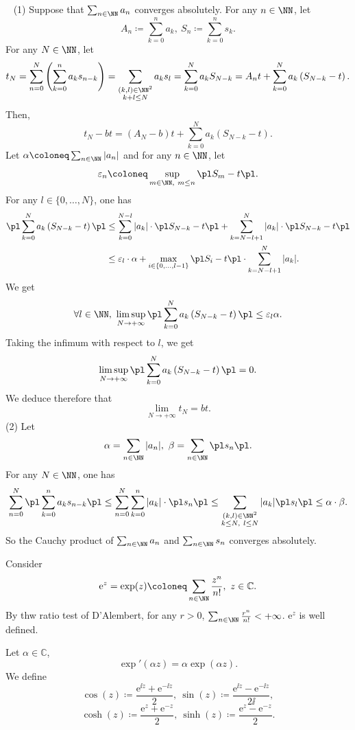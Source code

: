 \begin{proofenv}
    \ \newline
    (1) Suppose that $\sum_{n\in\NN}a_n$ converges absolutely. For any $n\in\NN$, let
    $$ A_n\coloneq \sum_{k=0}^{n}a_k,\ S_n\coloneq\sum_{k=0}^{n}s_k.$$
    For any $N\in\NN$, let
    $$ t_N = \sum_{n=0}^{N}\left(\sum_{k=0}^{n} a_k s_{n-k}\right)= \sum_{\substack{(k,l)\in\NN^2\\k+l\le N}}a_k s_l=\sum_{k=0}^{N}a_k S_{N-k}=A_n t+\sum_{k=0}^{N}a_k \left(S_{N-k}-t\right).$$
    Then,
    $$ t_N-bt=\left(A_N-b\right) t+\sum_{k=0}^{N}a_k \left(S_{N-k}-t\right).$$
    Let $\alpha\coloneq\sum_{n\in \NN}|a_n|$ and for any $n\in\NN$, let
    $$ \varepsilon_n\coloneq \sup_{m\in \NN,\ m\le n} \pl S_m-t \pl.$$
    For any $l\in \{0,\ldots,N\}$, one has
    \begin{align*}
        \pl \sum_{k=0}^{N}a_k \left(S_{N-k}-t\right)\pl &\le \sum_{k=0}^{N-l} |a_k|\cdot\pl S_{N-k} -t\pl +\sum_{k=N-l+1}^{N}|a_k|\cdot\pl S_{N-k}-t \pl \\
        &\le \varepsilon_{l}\cdot\alpha +\max_{i\in \{0,\ldots,l-1\}}\pl S_i-t\pl \cdot\sum_{k=N-l+1}^{N}|a_k|.
    \end{align*}
    We get 
    $$ \forall l\in \NN,\ \limsup_{N\rightarrow +\infty} \pl \sum_{k=0}^{N}a_k \left(S_{N-k}-t\right)\pl \le \varepsilon_{l} \alpha.$$
    Taking the infimum with respect to $l$, we get 
    $$ \limsup_{N\rightarrow+\infty}\pl \sum_{k=0}^{N} a_k \left(S_{N-k}-t\right)\pl=0.$$
    We deduce therefore that 
    $$ \lim_{N\rightarrow +\infty}t_N=bt.$$
    \newline
    (2) Let 
    $$ \alpha=\sum_{n\in\NN}|a_n|,\ \beta=\sum_{n\in\NN}\pl s_n\pl.$$
    For any $N\in\NN$, one has
    $$ \sum_{n=0}^{N} \pl \sum_{k=0}^{n}a_k s_{n-k}\pl \le \sum_{n=0}^{N}\sum_{k=0}^{n}|a_k|\cdot\pl s_n\pl\le \sum_{\substack{(k,l)\in \NN^2\\ k\le N,\ l\le N}} |a_k|\pl s_l\pl \le \alpha\cdot\beta.$$
    So the Cauchy product of $\sum_{n\in\NN}a_n$ and $\sum_{n\in\NN}s_n$ converges absolutely.
\end{proofenv}
\begin{exampleenv}
    Consider
    $$ \mathrm{e}^z=\exp(z)\coloneq\sum_{n\in\NN}\frac{z^n}{n!},\  z\in \mathbb{C}.$$
    By thw ratio test of D'Alembert, for any $r>0$, $\sum_{n\in\NN}\frac{r^n}{n!}<+\infty$. $\mathrm{e}^z$ is well defined.

    Let $\alpha\in \mathbb{C}$,
    $$ \exp'(\alpha z)= \alpha \exp(\alpha z).$$
    We define 
    $$ \cos (z)\coloneq \frac{\mathrm{e}^{\ii z}+\mathrm{e}^{-\ii z}}{2},\ \sin(z)\coloneq \frac{\mathrm{e}^{\ii z}-\mathrm{e}^{-\ii z}}{2\ii},$$
    $$ \cosh (z)\coloneq \frac{\mathrm{e}^{ z}+\mathrm{e}^{- z}}{2},\ \sinh(z)\coloneq \frac{\mathrm{e}^{ z}-\mathrm{e}^{- z}}{2}.$$

\end{exampleenv}
